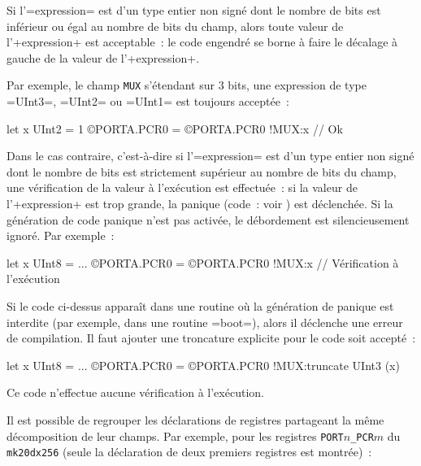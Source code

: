 Si l'\plm=expression= est d'un type entier non signé dont le nombre de bits est inférieur ou égal au nombre de bits du champ, alors toute valeur de l'\plm+expression+ est acceptable~: le code engendré se borne à faire le décalage à gauche de la valeur de l'\plm+expression+.

Par exemple, le champ \texttt{MUX} s'étendant sur $3$ bits, une expression de type \plm=UInt3=, \plm=UInt2= ou \plm=UInt1= est toujours acceptée~:

\begin{PLM}
let x UInt2 = 1
©PORTA.PCR0 = {©PORTA.PCR0 !MUX:x} // Ok
\end{PLM}

Dans le cas contraire, c'est-à-dire si l'\plm=expression= est d'un type entier non signé dont le nombre de bits est strictement supérieur au nombre de bits du champ, une vérification de la valeur à l'exécution est effectuée~: si la valeur de l'\plm+expression+ est trop grande, la panique (code~: voir ) est déclenchée. Si la génération de code panique n'est pas activée, le débordement est silencieusement ignoré. Par exemple~:

\begin{PLM}
let x UInt8 = ... 
©PORTA.PCR0 = {©PORTA.PCR0 !MUX:x} // Vérification à l'exécution
\end{PLM}

Si le code ci-dessus apparaît dans une routine où la génération de panique est interdite (par exemple, dans une routine \plm=boot=), alors il déclenche une erreur de compilation. Il faut ajouter une troncature explicite pour le code soit accepté~:

\begin{PLM}
let x UInt8 = ... 
©PORTA.PCR0 = {©PORTA.PCR0 !MUX:truncate UInt3 (x)}
\end{PLM}

Ce code n'effectue aucune vérification à l'exécution.

















Il est possible de regrouper les déclarations de registres partageant la même décomposition de leur champs. Par exemple, pour les registres \texttt{PORT$n$\_PCR$m$} du \texttt{mk20dx256} (seule la déclaration de deux premiers registres est montrée)~:

